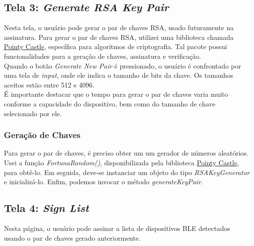\documentclass[a4paper,12pt]{article}
\begin{document}
\subsection{Tela 3: \textit{Generate RSA Key Pair}}
Nesta tela, o usuário pode gerar o par de chaves RSA, usado futuramente na assinatura. Para gerar o par de chaves RSA, utilizei uma biblioteca chamada \href{https://pub.dev/packages/pointycastle}{Pointy Castle}, específica para algoritmos de criptografia. Tal pacote possui  funcionalidades para a geração de chaves, assinatura e verificação.\\
Quando o botão \textit{Generate New Pair} é pressionado, o usuário é confrontado por uma tela de \textit{input}, onde ele indica o tamanho de bits da chave. Os tamanhos aceitos estão entre 512 e 4096.\\
É importante destacar que o tempo para gerar o par de chaves varia muito conforme a capacidade do dispositivo, bem como do tamanho de chave selecionado por ele.
\subsubsection{Geração de Chaves}
Para gerar o par de chaves, é preciso obter um um gerador de números aleatórios. Usei a função \textit{FortunaRandom()}, disponibilizada pela biblioteca \href{https://pub.dev/packages/pointycastle}{Pointy Castle}, para obtê-lo. Em seguida, deve-se instanciar um objeto do tipo \textit{RSAKeyGenerator} e inicializá-lo. Enfim, podemos invocar o método \textit{generateKeyPair}.
\subsection{Tela 4: \textit{Sign List}}
Nesta página, o usuário pode assinar a lista de dispositivos BLE detectados usando o par de chaves gerado anteriormente.
\end{document}
